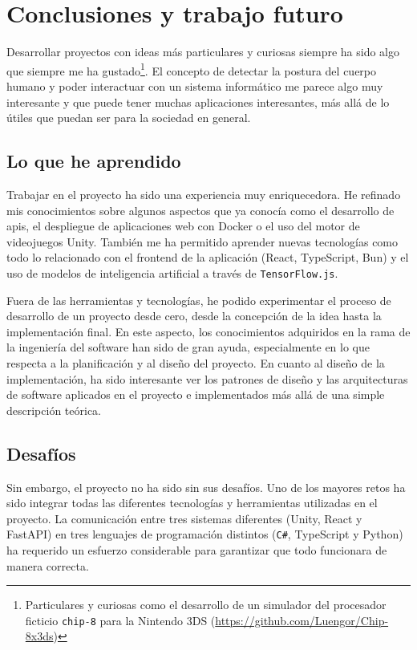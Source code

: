\chapter{Conclusiones y trabajo futuro}
\label{cap:conclusiones}
Desarrollar proyectos con ideas más particulares y curiosas siempre ha sido algo que siempre me ha
gustado\footnote{Particulares y curiosas como el desarrollo de un simulador del procesador ficticio
\texttt{chip-8} para la Nintendo 3DS (\url{https://github.com/Luengor/Chip-8x3ds})}.
El concepto de detectar la postura del cuerpo humano y poder interactuar con un sistema informático
me parece algo muy interesante y que puede tener muchas aplicaciones interesantes, más allá de lo
útiles que puedan ser para la sociedad en general.

\section{Lo que he aprendido}
Trabajar en el proyecto ha sido una experiencia muy enriquecedora. He refinado mis
conocimientos sobre algunos aspectos que ya conocía como el desarrollo de \glspl{api}, el despliegue
de aplicaciones web con Docker o el uso del motor de videojuegos Unity. También
me ha permitido aprender nuevas tecnologías como todo lo relacionado con el \gls{frontend} de la
aplicación (React, TypeScript, Bun) y el uso de modelos de inteligencia
artificial a través de \texttt{TensorFlow.js}.

Fuera de las herramientas y tecnologías, he podido experimentar el proceso de desarrollo de un
proyecto desde cero, desde la concepción de la idea hasta la implementación final. En este aspecto,
los conocimientos adquiridos en la rama de la ingeniería del software han sido de gran ayuda,
especialmente en lo que respecta a la planificación y al diseño del proyecto. En cuanto al diseño
de la implementación, ha sido interesante ver los patrones de diseño y las arquitecturas de software
aplicados en el proyecto e implementados más allá de una simple descripción teórica.

\section{Desafíos}
Sin embargo, el proyecto no ha sido sin sus desafíos. Uno de los mayores retos ha sido integrar
todas las diferentes tecnologías y herramientas utilizadas en el proyecto. La comunicación entre
tres sistemas diferentes (Unity, React y FastAPI) en tres lenguajes
de programación distintos (\texttt{C\#}, TypeScript y Python) ha requerido un
esfuerzo considerable para garantizar que todo funcionara de manera correcta.

